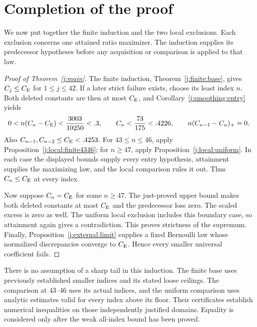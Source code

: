 \section{Completion of the proof}\label{j:composition}

We now put together the finite induction and the two local exclusions.
Each exclusion concerns one attained ratio maximizer. The induction
supplies its predecessor hypotheses before any acquisition or comparison
is applied to that law.

\begin{proof}[Proof of Theorem~\ref{j:main}]
The finite induction, Theorem~\ref{j:finite:base}, gives
$C_j\le C_{\mathrm E}$ for $1\le j\le42$. If a later strict failure exists,
choose its least index $n$. Both deleted constants are then at most
$C_{\mathrm E}$, and Corollary~\ref{j:smoothing:entry} yields
\[
 0<n(C_n-C_{\mathrm E})<\frac{3003}{10250}<.3,\qquad
 C_n<\frac{73}{175}<.4226,\qquad
 n(C_{n-1}-C_n)_+=0.
\]
Also $C_{n-1},C_{n-2}\le C_{\mathrm E}<.4253$.
For $43\le n\le46$, apply Proposition~\ref{j:local:finite4346};
for $n\ge47$, apply Proposition~\ref{j:local:uniform}.
In each case the displayed bounds supply every entry hypothesis,
attainment supplies the maximizing law, and the local comparison rules
it out. Thus $C_n\le C_{\mathrm E}$ at every index.

Now suppose $C_n=C_{\mathrm E}$ for some $n\ge47$. The just-proved upper bound
makes both deleted constants at most $C_{\mathrm E}$ and the predecessor loss
zero. The scaled excess is zero as well. The uniform local exclusion
includes this boundary case, so attainment again gives a contradiction.
This proves strictness of the supremum. Finally,
Proposition~\ref{j:external:limit} supplies a fixed Bernoulli law whose
normalized discrepancies converge to $C_{\mathrm E}$. Hence every smaller
universal coefficient fails.
\end{proof}

There is no assumption of a sharp tail in this induction. The finite base
uses previously established smaller indices and its stated loose ceilings.
The comparison at $43$--$46$ uses its actual indices, and the uniform
comparison uses analytic estimates valid for every index above its floor.
Their certificates establish numerical inequalities on those independently
justified domains. Equality is considered only after the weak all-index
bound has been proved.
